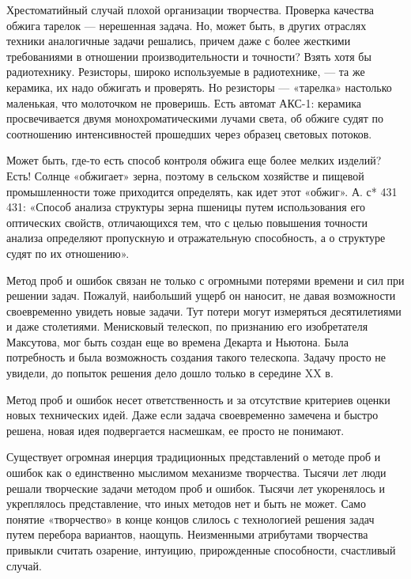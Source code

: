 Хрестоматийный случай плохой организации творчества. Проверка качества
обжига тарелок — нерешенная задача.  Но, может быть, в других отраслях
техники  аналогичные задачи  решались,  причем даже  с более  жесткими
требованиями в отношении производительности  и точности? Взять хотя бы
радиотехнику. Резисторы,  широко используемые в радиотехнике,  — та же
керамика,  их надо  обжигать  и проверять.  Но  резисторы —  «тарелка»
настолько маленькая, что молоточком  не проверишь. Есть автомат АКС-1:
керамика  просвечивается  двумя  монохроматическими лучами  света,  об
обжиге  судят по  соотношению интенсивностей  прошедших через  образец
световых потоков.

Может  быть,  где-то есть  способ  контроля  обжига еще  более  мелких
изделий? Есть! Солнце «обжигает» зерна, поэтому в сельском хозяйстве и
пищевой  промышленности  тоже  приходится определять,  как  идет  этот
«обжиг». А. с* 431 431:  «Способ анализа структуры зерна пшеницы путем
использования его  оптических свойств,  отличающихся тем, что  с целью
повышения  точности  анализа  определяют  пропускную  и  отражательную
способность, а о структуре судят по их отношению».


Метод проб  и ошибок связан не  только с огромными потерями  времени и
сил при решении задач. Пожалуй,  наибольший ущерб он наносит, не давая
возможности  своевременно  увидеть  новые  задачи.  Тут  потери  могут
измеряться десятилетиями  и даже  столетиями. Менисковый  телескоп, по
признанию его изобретателя  Максутова, мог быть создан  еще во времена
Декарта и Ньютона. Была потребность и была возможность создания такого
телескопа. Задачу  просто не  увидели, до  попыток решения  дело дошло
только в середине XX в.

Метод проб  и ошибок несет  ответственность и за  отсутствие критериев
оценки новых технических идей.  Даже если задача своевременно замечена
и  быстро решена,  новая  идея подвергается  насмешкам,  ее просто  не
понимают.

Существует огромная инерция традиционных представлений о методе проб и
ошибок  как о  единственно мыслимом  механизме творчества.  Тысячи лет
люди  решали  творческие задачи  методом  проб  и ошибок.  Тысячи  лет
укоренялось  и  укреплялось  представление,  что иных  методов  нет  и
быть  не  может. Само  понятие  «творчество»  в конце  концов  слилось
с  технологией  решения  задач   путем  перебора  вариантов,  наощупь.
Неизменными атрибутами творчества привыкли считать озарение, интуицию,
прирожденные способности, счастливый случай.


